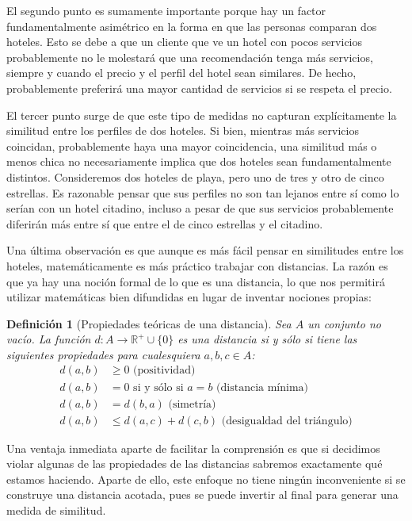 \documentclass[12pt]{report}
\newcommand{\R}{\mathbb{R}}
\newtheorem{defn}{Definici\'on}[chapter]
\begin{document}
El segundo punto es sumamente importante porque hay un factor fundamentalmente asimétrico en la forma en que las personas comparan dos hoteles. Esto se debe a que un cliente que ve un hotel con pocos servicios probablemente no le molestará que una recomendación tenga más servicios, siempre y cuando el precio y el perfil del hotel sean similares. De hecho, probablemente preferirá una mayor cantidad de servicios si se respeta el precio.

El tercer punto surge de que este tipo de medidas no capturan explícitamente la similitud entre los perfiles de dos hoteles. Si bien, mientras más servicios coincidan, probablemente haya una mayor coincidencia, una similitud más o menos chica no necesariamente implica que dos hoteles sean fundamentalmente distintos. Consideremos dos hoteles de playa, pero uno de tres y otro de cinco estrellas. Es razonable pensar que sus perfiles no son tan lejanos entre sí como lo serían con un hotel citadino, incluso a pesar de que sus servicios probablemente diferirán más entre sí que entre el de cinco estrellas y el citadino.

Una última observación es que aunque es más fácil pensar en similitudes entre los hoteles, matemáticamente es más práctico trabajar con distancias. La razón es que ya hay una noción formal de lo que es una distancia, lo que nos permitirá utilizar matemáticas bien difundidas en lugar de inventar nociones propias:
\begin{defn}[Propiedades teóricas de una distancia]
Sea $A$ un conjunto no vacío. La función $d: A \to \R^+ \cup \{0\}$ es una distancia si y sólo si tiene las siguientes propiedades para cualesquiera $a, b, c \in A$:
\begin{align}
	d(a,b) &\geq 0 \text{ (positividad)}\label{dpos}\\
	d(a,b) &= 0 \text{ si y sólo si } a = b \text{ (distancia mínima)}\label{dmin}\\
	d(a,b) &= d(b,a) \text{ (simetría)}\label{dsim}\\
	d(a,b) &\leq d(a,c) + d(c,b) \text{ (desigualdad del triángulo)}\label{dtri}
\end{align}
\end{defn}
Una ventaja inmediata aparte de facilitar la comprensión es que si decidimos violar algunas de las propiedades de las distancias sabremos exactamente qué estamos haciendo. Aparte de ello, este enfoque no tiene ningún inconveniente si se construye una distancia acotada, pues se puede invertir al final para generar una medida de similitud. 
\end{document}
